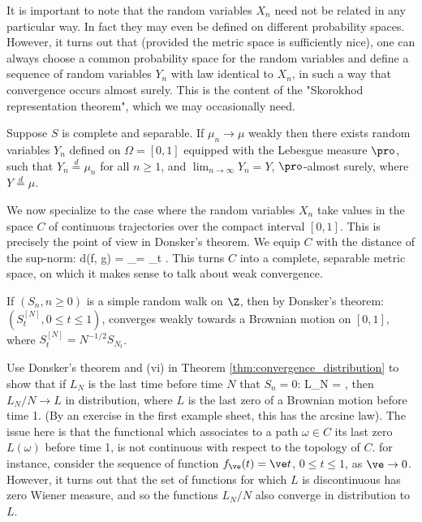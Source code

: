 It is important to note that the random variables $X_n$ need not be related in any particular way. In fact they may even be defined on different probability spaces. However, it turns out that (provided the metric space is sufficiently nice), one can always choose a common probability space for the random variables and define a sequence of random variables $Y_n$ with law identical to $X_n$, in such a way that convergence occurs almost surely. This is the content of the "Skorokhod representation theorem", which we may occasionally need.

\begin{lemma}
Suppose $S$ is complete and separable. If $\mu_n \to \mu$ weakly then there exists random variables $Y_n$ defined on $\Omega = [0, 1]$ equipped with the Lebesgue measure $\pro$, such that $Y_n \stackrel{d}{=} \mu_n$ for all $n \geq 1$, and $\lim_{n\to\infty} Y_n = Y$, $\pro$-almost surely, where $Y \stackrel{d}{=} \mu$.
\end{lemma}

We now specialize to the case where the random variables $X_n$ take values in the space $C$ of continuous trajectories over the compact interval $[0, 1]$. This is precisely the point of view in Donsker's theorem. We equip $C$ with the distance of the sup-norm:
\be
d(f, g) = _\infty = \sup_{t\in [0,1]} .
\ee
This turns $C$ into a complete, separable metric space, on which it makes sense to talk about weak convergence.

\begin{example}
If $(S_n, n \geq 0)$ is a simple random walk on $\Z$, then by Donsker's theorem: $(S^{[N]}_t , 0 \leq t \leq 1)$, converges weakly towards a Brownian motion on $[0, 1]$, where $S^{[N]}_t = N^{-1/2}S_{N_t}$. 
\end{example}

\begin{problem}
Use Donsker's theorem and (vi) in Theorem \ref{thm:convergence_distribution} to show that if $L_N$ is the last time before time $N$ that $S_n = 0$:
\be
L_N = \max{},
\ee
then $L_N/N \to L$ in distribution, where $L$ is the last zero of a Brownian motion before time 1. (By an exercise in the first example sheet, this has the arcsine law). The issue here is that the functional which associates to a path $\omega \in C$ its last zero $L(\omega)$ before time 1, is not continuous with respect to the topology of $C$. for instance, consider the sequence of function $f_\ve(t) = \ve t$, $0 \leq t \leq 1$, as $\ve \to 0$. However, it turns out that the set of functions for which $L$ is discontinuous has zero Wiener measure, and so the functions $L_N/N$ also converge in distribution to $L$.
\end{problem}



